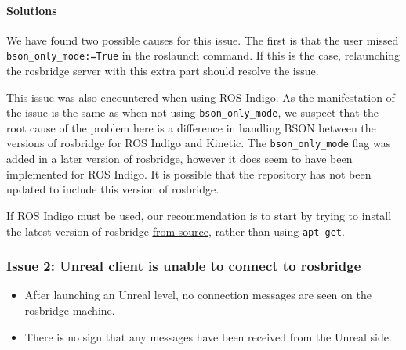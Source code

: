 \documentclass[../main.tex]{subfiles}
\begin{document}
\paragraph{Solutions} We have found two possible causes for this issue. The first is that the user missed \texttt{bson\_only\_mode:=True} in the roslaunch command. If this is the case, relaunching the rosbridge server with this extra part should resolve the issue.

This issue was also encountered when using ROS Indigo. As the manifestation of the issue is the same as when not using \texttt{bson\_only\_mode}, we suspect that the root cause of the problem here is a difference in handling BSON between the versions of rosbridge for ROS Indigo and Kinetic. The \texttt{bson\_only\_mode} flag was added in a later version of rosbridge, however it does seem to have been implemented for ROS Indigo. It is possible that the repository has not been updated to include this version of rosbridge.

If ROS Indigo must be used, our recommendation is to start by trying to install the latest version of rosbridge \href{https://github.com/RobotWebTools/rosbridge_suite/tree/indigo}{\underline{from source}}, rather than using \texttt{apt-get}.

\subsubsection{Issue 2: Unreal client is unable to connect to rosbridge}
\begin{itemize}
    \item After launching an Unreal level, no connection messages are seen on the rosbridge machine.
    \item There is no sign that any messages have been received from the Unreal side.
\end{itemize}
\end{document}

